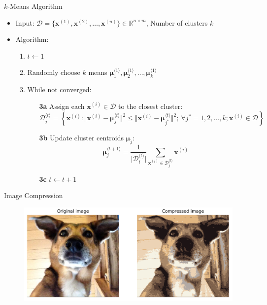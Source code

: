 \begin{frame}{$k$-Means Algorithm}{}
	\begin{itemize}
		\item Input: $\mathcal{D} = \{ \bm{x}^{(1)}, \bm{x}^{(2)}, \dots, \bm{x}^{(n)} \} \in \mathbb{R}^{n \times m}$,
			Number of clusters $k$	
		\item Algorithm:
		\begin{enumerate}
			\item $t \longleftarrow 1$
			\item Randomly choose $k$ means $\bm{\mu}_1^{\langle 1 \rangle}, \bm{\mu}_2^{\langle 1 \rangle}, \dots, \bm{\mu}_k^{\langle 1 \rangle}$ 
			\item While not converged:
			\begin{itemize}
				\item[\textbf{3a}] Assign each $\bm{x}^{(i)} \in \mathcal{D}$ to the closest cluster:
				{\footnotesize
				\begin{equation*}
					\mathcal{D}_j^{\langle t \rangle}
						= \left\{
							\bm{x}^{(i)} : \Vert \bm{x}^{(i)} - \bm{\mu}_j^{\langle t \rangle} \Vert^2 \le
							\Vert \bm{x}^{(i)} - \bm{\mu}_{j^*}^{\langle t \rangle} \Vert^2;\
							\forall j^* = 1, 2, \dots, k; \bm{x}^{(i)} \in \mathcal{D}
						\right\}
				\end{equation*}}
				\item[\textbf{3b}] Update cluster centroids $\bm{\mu}_j$:
				{\footnotesize
				\begin{equation*}
					\bm{\mu}_{j}^{\langle t+1 \rangle} =
						\frac{1}{\vert \mathcal{D}_i^{\langle t \rangle} \vert} \sum_{\bm{x}^{(i)} \in \mathcal{D}_j^{\langle t \rangle}} \bm{x}^{(i)}
				\end{equation*}}
				\item[\textbf{3c}] $t \longleftarrow t + 1$
			\end{itemize}
		\end{enumerate}
	\end{itemize}
\end{frame}


\begin{frame}{Image Compression}{}
	\begin{figure}
		\centering
		\includegraphics[scale=0.3]{12_clustering/02_img/image_compression}
	\end{figure}
\end{frame}


